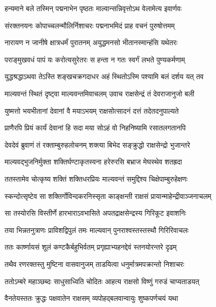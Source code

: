 
\twolineshloka
{हन्यमाने बले तस्मिन् पद्मनाभेन पृष्ठतः}
{माल्वान्सन्निवृत्तोऽथ वेलामेत्य इवार्णवः} %

\twolineshloka
{संरक्तनयनः कोपाच्चलन्मौलिर्निशाचरः}
{पद्मनाभमिदं प्राह वचनं पुरुषोत्तमम्} %

\twolineshloka
{नारायण न जानीषे क्षात्रधर्मं पुरातनम्}
{अयुद्धमनसो भीतानस्मान्हंसि यथेतरः} %

\twolineshloka
{पराङ्मुखवधं पापं यः करोत्यसुरेतरः}
{स हन्ता न गतः स्वर्गं लभते पुण्यकर्मणाम्} %

\twolineshloka
{युद्धश्रद्धाऽथवा तेऽस्ति शङ्खचक्रगदाधर}
{अहं स्थितोऽस्मि पश्यामि बलं दर्शय यत् तव} %

\twolineshloka
{माल्यवन्तं स्थितं दृष्ट्वा माल्यवन्तमिवाचलम्}
{उवाच राक्षसेन्द्रं तं देवराजानुजो बली} %

\twolineshloka
{युष्मत्तो भयभीतानां देवानां वै मयाऽभयम्}
{राक्षसोत्सादनं दत्तं तदेतदनुपाल्यते} %

\twolineshloka
{प्राणैरपि प्रियं कार्यं देवानां हि सदा मया}
{सोऽहं वो निहनिष्यामि रसातलगतानपि} %

\twolineshloka
{देवदेवं ब्रुवाणं तं रक्ताम्बुरुहलोचनम्}
{शक्त्या बिभेद सङ्क्रुद्धो राक्षसेन्द्रो भुजान्तरे} %

\twolineshloka
{माल्यवद्भुजनिर्मुक्ता शक्तिर्घण्टाकृतस्वना}
{हरेरुरसि बभ्राज मेघस्थेव शतह्रदा} %

\twolineshloka
{ततस्तामेव चोत्कृष्य शक्तिं शक्तिधरप्रियः}
{माल्यवन्तं समुद्दिश्य चिक्षेपाम्बुरुहेक्षणः} %

\twolineshloka
{स्कन्दोत्सृष्टेव सा शक्तिर्गोविन्दकरनिस्सृता}
{काङ्क्षन्ती राक्षसं प्रायान्माहेन्द्रीवाञ्जनाचलम्} %

\twolineshloka
{सा तस्योरसि विस्तीर्णे हारभाराऽवभासिते}
{अपतद्राक्षसेन्द्रस्य गिरिकूट इवाशनिः} %

\twolineshloka
{तया भिन्नतनुत्राणः प्राविशद्विपुलं तमः}
{माल्यवान् पुनराश्वस्तस्तस्थौ गिरिरिवाचलः} %

\twolineshloka
{ततः कार्ष्णायसं शूलं कण्टकैर्बहुभिर्वतम्}
{प्रगृह्याभ्यहनद्देवं स्तनयोरन्तरे दृढम्} %

\twolineshloka
{तथैव रणरक्तस्तु मुष्टिना वासवानुजम्}
{ताडयित्वा धनुर्मात्रमपक्रान्तो निशाचरः} %

\twolineshloka
{ततोऽम्बरे महाञ्छब्दः साधुसाध्विति चोदितः}
{आहत्य राक्षसो विष्णुं गरुडं चाप्यताडयत्} %

\twolineshloka
{वैनतेयस्ततः क्रुद्धः पक्षवातेन राक्षसम्}
{व्यपोहद्बलवान्वायुः शुष्कपर्णचयं यथा} %

